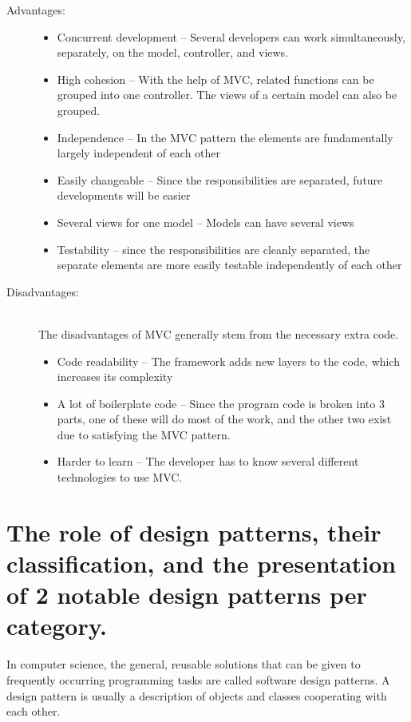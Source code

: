 \documentclass[margin=0px]{article}
\begin{document}
\begin{description}
    \item[Advantages:] \hfill
        \begin{itemize}
            \item Concurrent development -- Several developers can work simultaneously, separately, on the model, controller, and views.
            \item High cohesion -- With the help of MVC, related functions can be grouped into one controller. The views of a certain model can also be grouped.
            \item Independence -- In the MVC pattern the elements are fundamentally largely independent of each other
            \item Easily changeable -- Since the responsibilities are separated, future developments will be easier
            \item Several views for one model -- Models can have several views
            \item Testability -- since the responsibilities are cleanly separated, the separate elements are more easily testable independently of each other
        \end{itemize}
    \item[Disadvantages:] \hfill \\
        The disadvantages of MVC generally stem from the necessary extra code.
        \begin{itemize}
            \item Code readability -- The framework adds new layers to the code, which increases its complexity
            \item A lot of boilerplate code -- Since the program code is broken into 3 parts, one of these will do most of the work, and the other two exist due to satisfying the MVC pattern.
            \item Harder to learn -- The developer has to know several different technologies to use MVC.
        \end{itemize}
\end{description}

\section{The role of design patterns, their classification, and the presentation of 2 notable design patterns per category.}
In computer science, the general, reusable solutions that can be given to frequently occurring programming tasks are called software design patterns. A design pattern is usually a description of objects and classes cooperating with each other.
\end{document}
